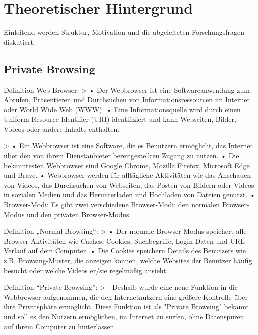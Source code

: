 \chapter{Theoretischer Hintergrund}

Einleitend werden Struktur, Motivation und die abgeleiteten Forschungsfragen diskutiert.

\section{Private Browsing}

Definition Web Browser: 	
	> \cite{Rochmadi.2017}
		•	Der Webbrowser ist eine Softwareanwendung zum Abrufen, Präsentieren und Durchsuchen von Informationsressourcen im Internet oder World Wide Web (WWW).
		•	Eine Informationsquelle wird durch einen Uniform Resource Identifier (URI) identifiziert und kann Webseiten, Bilder, Videos oder andere Inhalte enthalten.
		
	> \cite{Izzati.2022}
		•	Ein Webbrowser ist eine Software, die es Benutzern ermöglicht, das Internet über den von ihrem Dienstanbieter bereitgestellten Zugang zu nutzen.
		•	Die bekanntesten Webbrowser sind Google Chrome, Mozilla Firefox, Microsoft Edge und Brave.
		•	Webbrowser werden für alltägliche Aktivitäten wie das Anschauen von Videos, das Durchsuchen von Webseiten, das Posten von Bildern oder Videos in sozialen Medien und das Herunterladen und Hochladen von Dateien genutzt.
		•	Browser-Modi: Es gibt zwei verschiedene Browser-Modi: den normalen Browser-Modus und den privaten Browser-Modus.
		
	
Definition „Normal Browsing“:
	> \cite{Izzati.2022}	
		•	Der normale Browser-Modus speichert alle Browser-Aktivitäten wie Caches, Cookies, Suchbegriffe, Login-Daten und URL-Verlauf auf dem Computer.
		•	Die Cookies speichern Details des Benutzers wie z.B. Browsing-Muster, die anzeigen können, welche Websites der Benutzer häufig besucht oder welche Videos er/sie regelmäßig ansieht.
	

Definition “Private Browsing”: 	
	> \cite{Said.2011}
		-	Deshalb wurde eine neue Funktion in die Webbrowser aufgenommen, die den Internetnutzern eine größere Kontrolle über ihre Privatsphäre ermöglicht. Diese Funktion ist als "Private Browsing" bekannt und soll es den Nutzern ermöglichen, im Internet zu surfen, ohne Datenspuren auf ihrem Computer zu hinterlassen.
	
